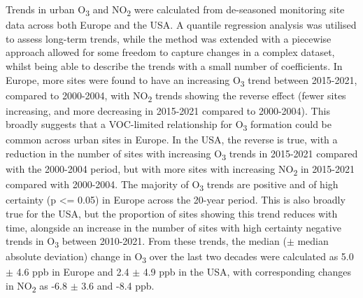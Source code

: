 \documentclass[journal abbreviation, manuscript]{copernicus}
\begin{document}
Trends in urban O\textsubscript{3} and NO\textsubscript{2} were calculated from de-seasoned monitoring site data across both Europe and the USA. A quantile regression analysis was utilised to assess long-term trends, while the method was extended with a piecewise approach allowed for some freedom to capture changes in a complex dataset, whilst being able to describe the trends with a small number of coefficients. 
In Europe, more sites were found to have an increasing O\textsubscript{3} trend between 2015-2021, compared to 2000-2004, with NO\textsubscript{2} trends showing the reverse effect (fewer sites increasing, and more decreasing in 2015-2021 compared to 2000-2004). This broadly suggests that a VOC-limited relationship for O\textsubscript{3} formation could be common across urban sites in Europe. In the USA, the reverse is true, with a reduction in the number of sites with increasing O\textsubscript{3} trends in 2015-2021 compared with the 2000-2004 period, but with more sites with increasing NO\textsubscript{2} in 2015-2021 compared with 2000-2004.
The majority of O\textsubscript{3} trends are positive and of high certainty (p <= 0.05) in Europe across the 20-year period. This is also broadly true for the USA, but the proportion of sites showing this trend reduces with time, alongside an increase in the number of sites with high certainty negative trends in O\textsubscript{3} between 2010-2021.
From these trends, the median ($\pm$ median absolute deviation) change in O\textsubscript{3} over the last two decades were calculated as 5.0 $\pm$ 4.6 ppb in Europe and 2.4 $\pm$ 4.9 ppb in the USA, with corresponding changes in NO\textsubscript{2} as -6.8 $\pm$ 3.6 and -8.4 ppb.
\end{document}
